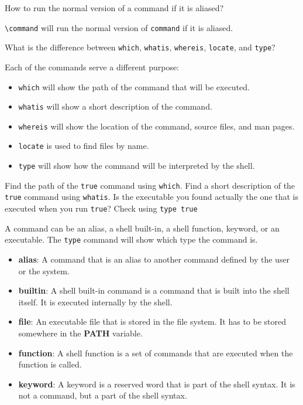 \begin{qs}
  How to run the normal version of a command if it is aliased?
\end{qs}

\begin{ans}
  \texttt{\textbackslash command} will run the normal version of \texttt{command} if it is aliased.
\end{ans}

\begin{qs}
  What is the difference between \texttt{which}, \texttt{whatis}, \texttt{whereis}, \texttt{locate}, and \texttt{type}?
\end{qs}

\begin{ans}
  Each of the commands serve a different purpose:
  \begin{itemize}
    \item \texttt{which} will show the path of the command that will be executed.
    \item \texttt{whatis} will show a short description of the command.
    \item \texttt{whereis} will show the location of the command, source files, and man pages.
    \item \texttt{locate} is used to find files by name.
    \item \texttt{type} will show how the command will be interpreted by the shell.
  \end{itemize}
\end{ans}

\begin{exercise}
  Find the path of the \texttt{true} command using \texttt{which}.
  Find a short description of the \texttt{true} command using \texttt{whatis}.
  Is the executable you found actually the one that is executed when you run \texttt{true}? Check using \texttt{type true}
\end{exercise}

\begin{definition}
  A command can be an alias, a shell built-in, a shell function, keyword, or an executable.
  The \texttt{type} command will show which type the command is.
  \begin{itemize}
    \item \textbf{alias}: A command that is an alias to another command defined
    by the user or the system.
    \item \textbf{builtin}: A shell built-in command is a command that is built
    into the shell itself. It is executed internally by the shell.
    \item \textbf{file}: An executable file that is stored in the file system.
      It has to be stored somewhere in the \textbf{PATH} variable.
    \item \textbf{function}: A shell function is a set of commands that are
    executed when the function is called.
    \item \textbf{keyword}: A keyword is a reserved word that is part of the shell
    syntax. It is not a command, but a part of the shell syntax.
  \end{itemize}
\end{definition}

